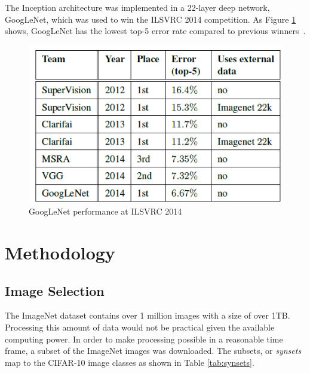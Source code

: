 \documentclass{article}
\begin{document}
The Inception architecture was implemented in a 22-layer deep network, GoogLeNet, which was used to win the ILSVRC 2014 competition. As Figure \ref{fig:googlenet-comp-perf} shows, GoogLeNet has the lowest top-5 error rate compared to previous winners~\cite{szegedy2015going}.

\begin{figure}[ht]
    \centering
    \includegraphics[scale=0.7]{project/paper_images/googlenet_competition_perf.png}
    \caption{GoogLeNet performance at ILSVRC 2014}
    \label{fig:googlenet-comp-perf}
\end{figure}


\section{Methodology}

\subsection{Image Selection}
The ImageNet dataset contains over 1 million images with a size of over 1TB. Processing this amount of data would not be practical given the available computing power. In order to make processing possible in a reasonable time frame, a subset of the ImageNet images was downloaded. The subsets, or \textit{synsets} map to the CIFAR-10 image classes as shown in Table \ref{tab:synsets}.
\end{document}
